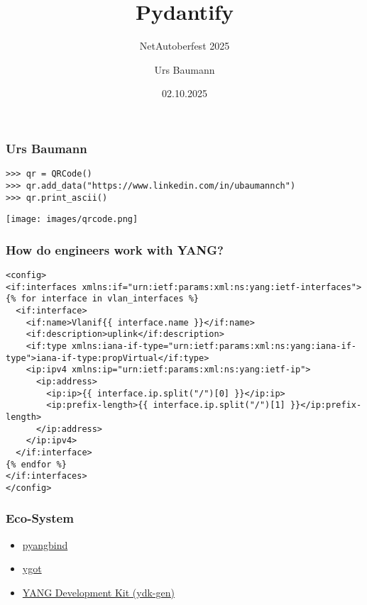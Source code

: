 \documentclass[aspectratio=169]{beamer}
\title{Pydantify}
\subtitle{NetAutoberfest 2025}
\author{Urs Baumann}
\date{02.10.2025}
\begin{document}
{
\frame{\titlepage}
}


\begin{frame}[fragile]
  \frametitle{Urs Baumann}

  \begin{verbatim}
>>> qr = QRCode()
>>> qr.add_data("https://www.linkedin.com/in/ubaumannch")
>>> qr.print_ascii()
  \end{verbatim}

  \texttt{[image: images/qrcode.png]}

\end{frame}


\begin{frame}[fragile]
  \frametitle{How do engineers work with YANG?}
  \begin{verbatim}
<config>
<if:interfaces xmlns:if="urn:ietf:params:xml:ns:yang:ietf-interfaces">
{% for interface in vlan_interfaces %}
  <if:interface>
    <if:name>Vlanif{{ interface.name }}</if:name>
    <if:description>uplink</if:description>
    <if:type xmlns:iana-if-type="urn:ietf:params:xml:ns:yang:iana-if-type">iana-if-type:propVirtual</if:type>
    <ip:ipv4 xmlns:ip="urn:ietf:params:xml:ns:yang:ietf-ip">
      <ip:address>
        <ip:ip>{{ interface.ip.split("/")[0] }}</ip:ip>
        <ip:prefix-length>{{ interface.ip.split("/")[1] }}</ip:prefix-length>
      </ip:address>
    </ip:ipv4>
  </if:interface>
{% endfor %}
</if:interfaces>
</config>
\end{verbatim}
\end{frame}

\begin{frame}
  \frametitle{Eco-System}
  \begin{itemize}
    \setlength\itemsep{1em}
    \item \href{https://github.com/robshakir/pyangbind}{pyangbind}
    \item \href{https://github.com/openconfig/ygot}{ygot}
    \item \href{https://github.com/CiscoDevNet/ydk-gen}{YANG Development Kit (ydk-gen)}
  \end{itemize}
\end{frame}
\end{document}
